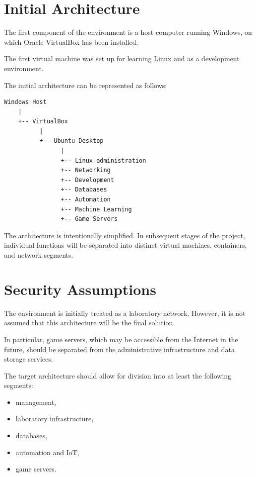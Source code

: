\section{Initial Architecture}

The first component of the environment is a host computer running Windows,
on which Oracle VirtualBox has been installed.

The first virtual machine was set up for learning Linux
and as a development environment.

The initial architecture can be represented as follows:

\begin{lstlisting}[style=terminal]
Windows Host
    |
    +-- VirtualBox
          |
          +-- Ubuntu Desktop
                |
                +-- Linux administration
                +-- Networking
                +-- Development
                +-- Databases
                +-- Automation
                +-- Machine Learning
                +-- Game Servers
\end{lstlisting}

The architecture is intentionally simplified. In subsequent stages of the project,
individual functions will be separated into distinct virtual machines,
containers, and network segments.

\section{Security Assumptions}

The environment is initially treated as a laboratory network.
However, it is not assumed that this architecture will be the final solution.

In particular, game servers, which may be accessible
from the Internet in the future, should be separated from the administrative infrastructure
and data storage services.

The target architecture should allow for division into at least the following segments:

\begin{itemize}
    \item management,
    \item laboratory infrastructure,
    \item databases,
    \item automation and IoT,
    \item game servers.
\end{itemize}